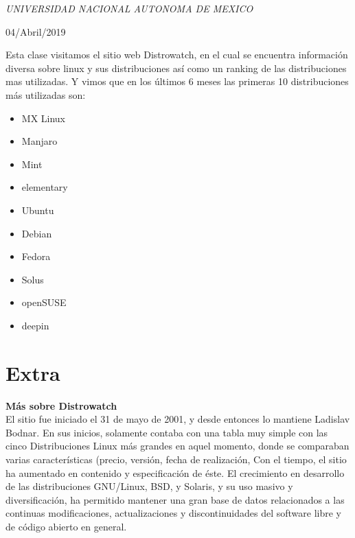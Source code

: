\documentclass[a4paper, 11pt, oneside]{article}
\begin{document}
\begin{titlepage}
	\textit{UNIVERSIDAD NACIONAL AUTONOMA DE MEXICO} 
	
	\vfill
	
	
	
	
	\vspace{0.3\baselineskip} 
	
	04/Abril/2019 
	
	

\end{titlepage}
Esta clase visitamos el sitio web Distrowatch, en el cual se encuentra información diversa sobre linux y sus distribuciones así como un ranking de las distribuciones mas utilizadas. Y vimos que en los últimos 6 meses las primeras 10 distribuciones más utilizadas son:
\begin{itemize}

    \item	MX Linux	
    \item	Manjaro	
    \item	Mint	
    \item	elementary	
    \item	Ubuntu	
    \item	Debian	
    \item	Fedora	
    \item	Solus	
    \item	openSUSE
    \item	deepin
\end{itemize}
\section*{Extra}
\textbf{Más sobre Distrowatch}\\
El sitio fue iniciado el 31 de mayo de 2001, y desde entonces lo mantiene Ladislav Bodnar. En sus inicios, solamente contaba con una tabla muy simple con las cinco Distribuciones Linux más grandes en aquel momento, donde se comparaban varias características (precio, versión, fecha de realización, Con el tiempo, el sitio ha aumentado en contenido y especificación de éste. El crecimiento en desarrollo de las distribuciones GNU/Linux, BSD, y Solaris, y su uso masivo y diversificación, ha permitido mantener una gran base de datos relacionados a las continuas modificaciones, actualizaciones y discontinuidades del software libre y de código abierto en general.
\end{document}
